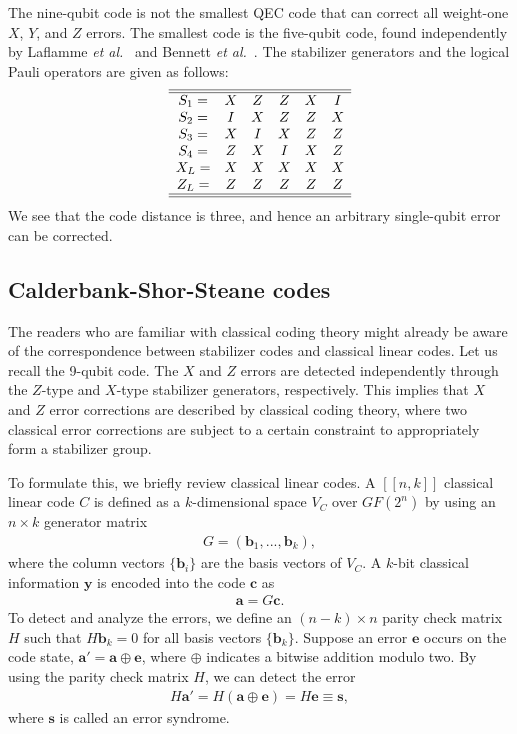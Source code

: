 The nine-qubit code is not the smallest QEC code that can correct all weight-one $X$, $Y$, and $Z$ errors.
The smallest code is the five-qubit code, found independently by Laflamme {\it et al.}~\cite{Laflamme96} and Bennett 
{\it et al.}~\cite{BCDSW96}.
The stabilizer generators and the logical Pauli operators are given as follows:
%
\begin{equation}
\begin{array}{cccccc}
\hline \hline
S_{1}=&X&Z&Z&X&I
\\
S_{2}=&I&X&Z&Z&X
\\
S_{3}=&X&I&X&Z&Z
\\
S_{4}=&Z&X&I&X&Z
\\
X_{L}=&X&X&X&X&X
\\
Z_{L}=&Z&Z&Z&Z&Z
\\
\hline \hline
\end{array}
\end{equation}
%
We see that the code distance is three, and hence an arbitrary single-qubit error can be corrected.


\subsection*{Calderbank-Shor-Steane codes}
The readers who are familiar with classical coding theory might already be aware of the correspondence between stabilizer codes and classical linear codes.
Let us recall the 9-qubit code.
The $X$ and $Z$ errors are detected independently through the $Z$-type and $X$-type stabilizer generators, respectively.
This implies that $X$ and $Z$ error corrections are described by classical coding theory, where two classical error corrections are subject to a certain constraint to appropriately form a stabilizer group.

To formulate this, we briefly review classical linear codes.
A $[[n,k]]$ classical linear code $C$ is defined as a $k$-dimensional space $V_C$ over $GF(2^{n})$ by using an $n \times k$ generator matrix
\begin{eqnarray}
G=( \mathbf{b}_1 , ..., \mathbf{b}_k),
\end{eqnarray}
where the column vectors $\{ \mathbf{b}_i\}$ are the basis vectors of $V_C$. 
A $k$-bit classical information $\mathbf{y}$ is encoded into the code $\mathbf{c}$ as
\begin{eqnarray}
\mathbf{a}= G \mathbf{c}.
\end{eqnarray}
To detect and analyze the errors, we define an $(n-k)\times n$ parity check matrix $H$ such that $H \mathbf{b}_k=0$ for all basis vectors 
$\{ \mathbf{b}_k\}$.
Suppose an error $\mathbf{e}$ occurs on the code state, $\mathbf{a}' = \mathbf{a}\oplus \mathbf{e}$, where $\oplus$ indicates a bitwise addition modulo two.
By using the parity check matrix $H$, we can detect the error
\begin{eqnarray}
H \mathbf{a}'  = H(\mathbf{a} \oplus \mathbf{e})=H \mathbf{e}\equiv \mathbf{s},
\end{eqnarray}
where $\mathbf{s}$ is called an error syndrome.

